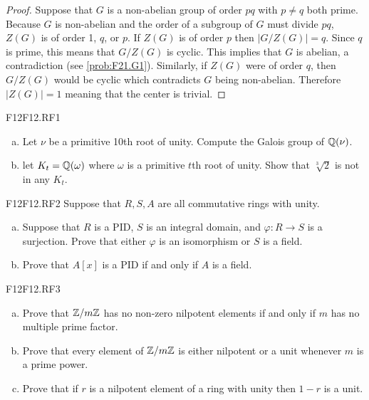 \documentclass[../AlgebraQualSolutions.tex]{subfiles}
\begin{document}
	\begin{proof}
		Suppose that $G$ is a non-abelian group of order $pq$ with $p \neq q$ both prime. Because $G$ is non-abelian and the order of a subgroup of $G$ must divide $pq$, $Z(G)$ is of order 1, $q$, or $p$. If $Z(G)$ is of order $p$ then $|G/Z(G)| = q$. Since $q$ is prime, this means that $G/Z(G)$ is cyclic. This implies that $G$ is abelian, a contradiction (see \ref{prob:F21.G1}). Similarly, if $Z(G)$ were of order $q$, then $G/Z(G)$ would be cyclic which contradicts $G$ being non-abelian. Therefore $|Z(G)| = 1$ meaning that the center is trivial.
	\end{proof}
	
	\begin{prob}{F12}{F12.RF1}
	\begin{enumerate}[(a)]
	\item Let $\nu$ be a primitive 10th root of unity. Compute the Galois group of $\mathbb{Q}(\nu)$.
	\item let $K_t = \mathbb{Q}(\omega)$ where $\omega$ is a primitive $t$th root of unity. Show that $\sqrt[3]{2}$ is not in any $K_t$.
	\end{enumerate}
	\end{prob}
	
	\begin{prob}{F12}{F12.RF2}
	Suppose that $R,S,A$ are all commutative rings with unity.
	\begin{enumerate}[(a)]
	\item Suppose that $R$ is a PID, $S$ is an integral domain, and $\varphi:R \to S$ is a surjection. Prove that either $\varphi$ is an isomorphism or $S$ is a field.
	\item Prove that $A[x]$ is a PID if and only if $A$ is a field.
	\end{enumerate}
	\end{prob}
	
	\begin{prob}{F12}{F12.RF3}
	\begin{enumerate}[(a)]
	\item Prove that $\mathbb{Z}/m\mathbb{Z}$ has no non-zero nilpotent elements if and only if $m$ has no multiple prime factor.
	\item Prove that every element of $\mathbb{Z}/m\mathbb{Z}$ is either nilpotent or a unit whenever $m$ is a prime power.
	\item Prove that if $r$ is a nilpotent element of a ring with unity then $1-r$ is a unit.
	\end{enumerate}
	\end{prob}
\end{document}
